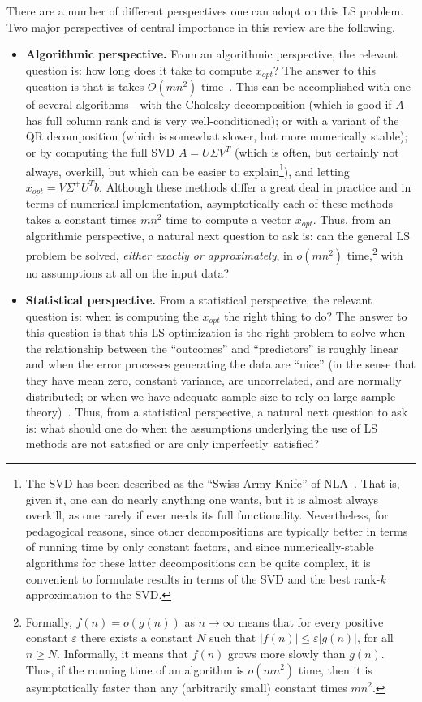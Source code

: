 \documentclass[twoside]{article}
\begin{document}
There are a number of different perspectives one can adopt on this LS 
problem.
Two major perspectives of central importance in this review are the 
following.
\begin{itemize}
\item
\textbf{Algorithmic perspective.}
From an algorithmic perspective, the relevant question is: how long does it 
take to compute $x_{opt}$?
The answer to this question is that is takes $O(mn^2)$ time~\cite{GVL96}.
This can be accomplished with one of several algorithms---with the Cholesky 
decomposition (which is good if $A$ has full column rank and is very 
well-conditioned); or with a variant of the QR decomposition (which is 
somewhat slower, but more numerically stable); or by computing the full 
SVD $A=U \Sigma V^T$ (which is often, but certainly not always, overkill, 
but which can be easier to explain\footnote{The SVD has been described as the ``Swiss Army Knife'' of 
NLA~\cite{MMDS06summary}.  That is, given it, one can do nearly anything one
wants, but it is almost always overkill, as one rarely if ever needs its full
functionality.  Nevertheless, for pedagogical reasons, since other 
decompositions are typically better in terms of running time by only constant 
factors, and since numerically-stable algorithms for these latter 
decompositions can be quite complex, it is convenient to formulate results in
terms of the SVD and the best rank-$k$ approximation to the SVD.}), 
and letting $x_{opt} = V \Sigma^{+} U^T b$.
Although these methods differ a great deal in practice and in terms of 
numerical implementation, asymptotically each of these methods takes a 
constant times $mn^2$ time to compute a vector $x_{opt}$.
Thus, from an algorithmic perspective, a natural next question to ask is:
can the general LS problem be solved, \emph{either exactly or approximately}, 
in $o(mn^2)$ time,\footnote{Formally, $f(n) = o(g(n))$ as $n \rightarrow \infty$ means that for 
every positive constant $\varepsilon$ there exists a constant $N$ such that
$|f(n)| \le \varepsilon|g(n)|$, for all $n \ge N$.  Informally, it means that 
$f(n)$ grows more slowly than $g(n)$.  Thus, if the running time of an 
algorithm is $o(mn^2)$ time, then it is asymptotically faster than any 
(arbitrarily small) constant times $mn^2$.}
with no assumptions at all on the input data?
\item
\textbf{Statistical perspective.}
From a statistical perspective, the relevant question is: when is computing 
the $x_{opt}$ the right thing to do?
The answer to this question is that this LS optimization is the right problem to
solve when the relationship between the ``outcomes'' and ``predictors'' is 
roughly linear and when the error processes generating the data are ``nice'' 
(in the sense that they have mean zero, constant variance, are uncorrelated, 
and are normally distributed; or when we have adequate sample size to rely 
on large sample theory)~\cite{ChatterjeeHadi88}.
Thus, from a statistical perspective, a natural next question to ask is:
what should one do when the assumptions underlying the use of LS methods 
are not satisfied or are only imperfectly~satisfied?
\end{itemize}
\end{document}
